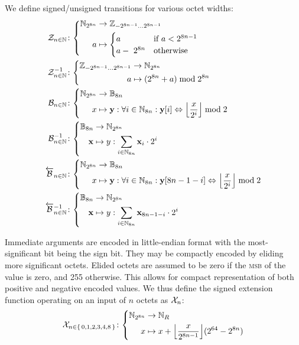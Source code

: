 We define signed/unsigned transitions for various octet widths:
\begin{align}
  \label{eq:signedfunc}
  \signfunc{n \in \N}&\colon\abracegroup{
    \Nbits{8n} &\to \Z_{-2^{8n-1}\dots2^{8n-1}}\\
    a &\mapsto \begin{cases}
      a &\when a < 2^{8n-1} \\
      a -\ 2^{8n} &\otherwise
    \end{cases}
  }\\
  \unsignfunc{n \in \N}&\colon\abracegroup{
    \Z_{-2^{8n-1}\dots2^{8n-1}} &\to \Nbits{8n}\\
    a &\mapsto (2^{8n} + a) \bmod 2^{8n}
  }\\
  \label{eq:bitsfunc}
  \bitsfunc{n\in\N}&\colon\abracegroup{
    \Nbits{8n} &\to \mathbb{B}_{8n}\\
    x &\mapsto \mathbf{y}: \forall i \in \Nmax{8n} : \mathbf{y}\subb{i} \Leftrightarrow \ffrac{x}{2^i}\bmod 2
  }\\
  \unbitsfunc{n\in\N}&\colon\abracegroup{
    \mathbb{B}_{8n} &\to \Nbits{8n}\\
    \mathbf{x} &\mapsto y: \sum_{i \in \Nmax{8n}} \mathbf{x}\sub{i} \cdot 2^i
  }\\
  \label{eq:revbitsfunc}
  \revbitsfunc{n\in\N}&\colon\abracegroup{
    \Nbits{8n} &\to \mathbb{B}_{8n}\\
    x &\mapsto \mathbf{y}: \forall i \in \Nmax{8n} : \mathbf{y}[8n - 1 - i] \Leftrightarrow \ffrac{x}{2^i}\bmod 2
  }\\
  \revunbitsfunc{n\in\N}&\colon\abracegroup{
    \mathbb{B}_{8n} &\to \Nbits{8n}\\
    \mathbf{x} &\mapsto y: \sum_{i \in \Nmax{8n}} \mathbf{x}\sub{8n - 1 - i} \cdot 2^i
  }
\end{align}

Immediate arguments are encoded in little-endian format with the most-significant bit being the sign bit. They may be compactly encoded by eliding more significant octets. Elided octets are assumed to be zero if the \textsc{msb} of the value is zero, and 255 otherwise. This allows for compact representation of both positive and negative encoded values. We thus define the signed extension function operating on an input of $n$ octets as $\mathcal{X}_{n}$:
\begin{align}\label{eq:signedextension}
  \fnsext{n \in \set{0, 1, 2, 3, 4, 8}}\colon\abracegroup{
    \Nbits{8n} &\to \pvmreg\\
    x &\mapsto x + \ffrac{x}{2^{8n-1}}(2^{64}-2^{8n})
  }
\end{align}

